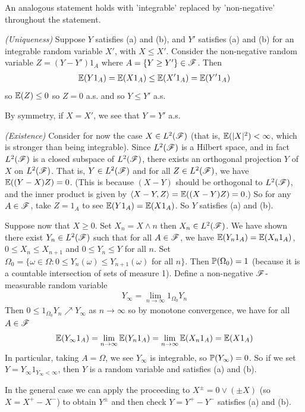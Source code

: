 \documentclass[12pt,a4paper]{report}
\newenvironment{proof}
{\begin{changemargin}{1cm}{0.5cm} 
	}%
	{\end{changemargin}
}
\begin{document}
An analogous statement holds with 'integrable' replaced by 'non-negative' throughout the statement.
\begin{proof}
\pf \emph{(Uniqueness)} Suppose $Y$ satisfies (a) and (b), and $Y'$ satisfies (a) and (b) for an integrable random variable $X'$, with $X \leq X'$. Consider the non-negative random variable $Z = (Y-Y')1_A$ where $A = \{Y\geq Y'\} \in \mathscr{F}$. Then
\begin{align*}
\mathbb{E}(Y1_A ) = \mathbb{E}(X1_A) \leq \mathbb{E}(X' 1_A) = \mathbb{E}(Y' 1_A)
\end{align*} 
so $\mathbb{E}(Z) \leq 0$ so $Z=0$ a.s. and so $Y\leq Y'$ a.s.

\quad By symmetry, if $X=X'$, we see that $Y=Y'$ a.s.

\emph{(Existence)} Consider for now the case $X \in L^2(\mathscr{F})$ (that is, $\mathbb{E}(|X|^2) <\infty$, which is stronger than being integrable). Since $L^2(\mathscr{F})$ is a Hilbert space, and in fact $L^2(\mathscr{F})$ is a closed subspace of $L^2(\mathscr{F})$, there exists an orthogonal projection $Y$ of $X$ on $L^2(\mathscr{F})$. That is, $Y \in L^2(\mathscr{F})$ and for all $Z \in L^2(\mathscr{F})$, we have $\mathbb{E}((Y-X)Z) =0$. (This is because $(X-Y)$ should be orthogonal to $L^2(\mathscr{F})$, and the inner product is given by $\langle X-Y, Z\rangle = \mathbb{E}((X-Y)Z) =0$.) So for any $A\in \mathscr{F}$, take $Z = 1_A$ to see $\mathbb{E}(Y1_A) = \mathbb{E}(X1_A)$. So $Y$ satisfies (a) and (b).

\quad Suppose now that $X \geq 0$. Set $X_n = X \wedge n$ then $X_n \in L^2(\mathscr{F})$. We have shown there exist $Y_n \in L^2(\mathscr{F})$ such that for all $A \in \mathscr{F}$, we have $\mathbb{E}(Y_n1_A) = \mathbb{E}(X_n 1_A)$, $0\leq X_n \leq X_{n+1}$ and $0 \leq Y_n \leq Y$ for all $n$. Set $\Omega_0 = \{\omega \in \Omega : 0 \leq Y_n(\omega) \leq Y_{n+1}(\omega)$ for all $n \}$. Then $\mathbb{P}(\Omega_0)=1$ (because it is a countable intersection of sets of measure 1). Define a non-negative $\mathscr{F}$-measurable random variable
\begin{align*}
Y_{\infty} =  \lim_{n\rightarrow \infty}  1_{\Omega_0} Y_n
\end{align*} 
Then $0 \leq 1_{\Omega_0} Y_n \nearrow Y_{\infty}$ as $n\rightarrow \infty$ so by monotone convergence, we have for all $A\in \mathscr{F}$
\begin{align*}
\mathbb{E}(Y_{\infty} 1_A) = \lim_{n\rightarrow \infty} \mathbb{E}(Y_n 1_A)  = \lim_{n\rightarrow \infty} \mathbb{E}(X_n 1_A) = \mathbb{E}(X 1_A)
\end{align*}
In particular, taking $A =\Omega$, we see $Y_{\infty}$ is integrable, so $\mathbb{P}(Y_{\infty})=0$. So if we set $Y= Y_{\infty} 1_{Y_{\infty}<\infty}$, then $Y$ is a random variable and satisfies (a) and (b).

\quad In the general case we can apply the proceeding to $X^{\pm} = 0 \vee (\pm X)$ (so $X = X^+ - X^-$) to obtain $Y^{\pm}$ and then check $Y= Y^+ - Y^-$ satisfies (a) and (b).

\eop 
\end{proof}
\end{document}
